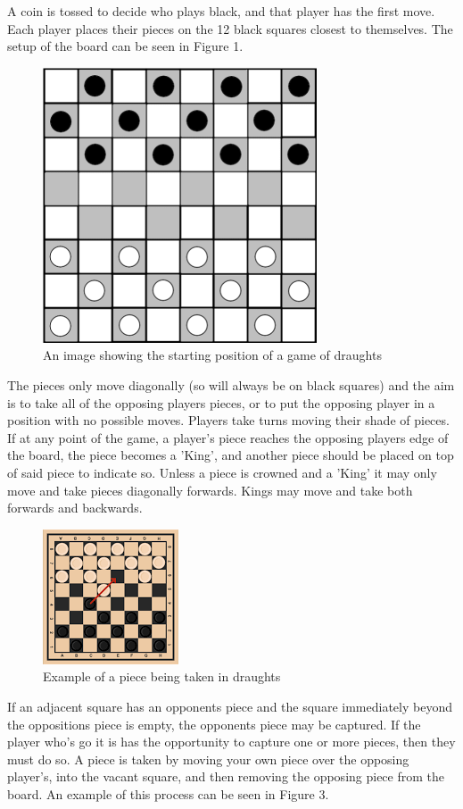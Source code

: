 \documentclass{article}
\begin{document}
    A coin is tossed to decide who plays black, and that player has the first move. Each player places their pieces
    on the 12 black squares closest to themselves. The setup of the board can be seen in Figure 1. 

    \begin{figure}
        \centering
        \includegraphics[scale=0.35]{The-starting-position-for-checkers.png}
        \caption{An image showing the starting position of a game of draughts}
    \end{figure}
    The pieces only move diagonally (so will always be on black squares)
    and the aim is to take all of the opposing players pieces, or to put the opposing player in a position with no possible moves.
    Players take turns moving their shade of pieces. If at any point of the game, a player's piece reaches the opposing players edge
    of the board, the piece becomes a 'King', and another piece should be placed on top of said piece to indicate so.
    Unless a piece is crowned and a 'King' it may only move and take pieces diagonally forwards. Kings may move and take both forwards and backwards.
    
    \begin{figure}
        \centering
        \includegraphics[scale=1.15]{piece being taken.png}
        \caption{Example of a piece being taken in draughts}
    \end{figure}
    If an adjacent square has an opponents piece and the square immediately beyond the oppositions piece is empty, the opponents piece may be captured.
    If the player who's go it is has the opportunity to capture one or more pieces, then they must do so. 
    A piece is taken by moving your own piece over the opposing player's, into the vacant square, and then removing the opposing piece from the board.
    An example of this process can be seen in Figure 3.
\end{document}
